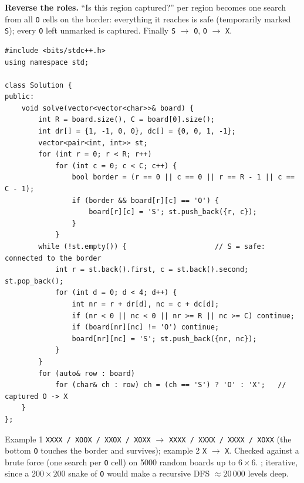 \begin{solutionbox}
\textbf{Reverse the roles.} ``Is this region captured?'' per region becomes one search from all \texttt{O} cells on the border: everything it reaches is safe (temporarily marked \texttt{S}); every \texttt{O} left unmarked is captured. Finally \texttt{S} $\to$ \texttt{O}, \texttt{O} $\to$ \texttt{X}.
\begin{lstlisting}[style=cpp]
#include <bits/stdc++.h>
using namespace std;

class Solution {
public:
    void solve(vector<vector<char>>& board) {
        int R = board.size(), C = board[0].size();
        int dr[] = {1, -1, 0, 0}, dc[] = {0, 0, 1, -1};
        vector<pair<int, int>> st;
        for (int r = 0; r < R; r++)
            for (int c = 0; c < C; c++) {
                bool border = (r == 0 || c == 0 || r == R - 1 || c == C - 1);
                if (border && board[r][c] == 'O') {
                    board[r][c] = 'S'; st.push_back({r, c});
                }
            }
        while (!st.empty()) {                     // S = safe: connected to the border
            int r = st.back().first, c = st.back().second; st.pop_back();
            for (int d = 0; d < 4; d++) {
                int nr = r + dr[d], nc = c + dc[d];
                if (nr < 0 || nc < 0 || nr >= R || nc >= C) continue;
                if (board[nr][nc] != 'O') continue;
                board[nr][nc] = 'S'; st.push_back({nr, nc});
            }
        }
        for (auto& row : board)
            for (char& ch : row) ch = (ch == 'S') ? 'O' : 'X';   // captured O -> X
    }
};
\end{lstlisting}
Example 1 \texttt{XXXX / XOOX / XXOX / XOXX} $\to$ \texttt{XXXX / XXXX / XXXX / XOXX} (the bottom \texttt{O} touches the border and survives); example 2 \texttt{X} $\to$ \texttt{X}. Checked against a brute force (one search per \texttt{O} cell) on 5000 random boards up to $6 \times 6$. ; iterative, since a $200 \times 200$ snake of \texttt{O} would make a recursive DFS $\approx 20\,000$ levels deep.
\end{solutionbox}

